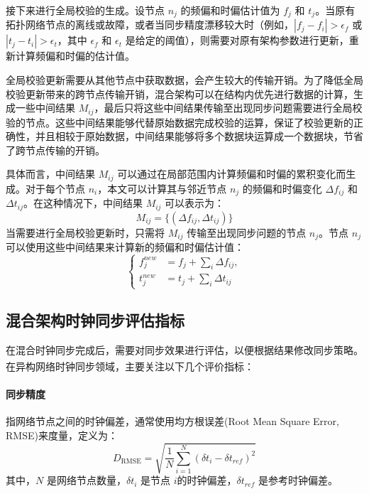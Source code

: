 \documentclass[UTF8,a4paper,12pt]{ctexart}
\numberwithin{equation}{section}
\begin{document}
	接下来进行全局校验的生成。设节点 $n_j$ 的频偏和时偏估计值为 $f_j$ 和 $t_j$。当原有拓扑网络节点的离线或故障，或者当同步精度漂移较大时（例如，$|f_j - f_i| > \epsilon_f$ 或 $|t_j - t_i| > \epsilon_t$，其中 $\epsilon_f$ 和 $\epsilon_t$ 是给定的阈值），则需要对原有架构参数进行更新，重新计算频偏和时偏的估计值。
	
	全局校验更新需要从其他节点中获取数据，会产生较大的传输开销。为了降低全局校验更新带来的跨节点传输开销，混合架构可以在结构内优先进行数据的计算，生成一些中间结果 $M_{ij}$，最后只将这些中间结果传输至出现同步问题需要进行全局校验的节点。这些中间结果能够代替原始数据完成校验的运算，保证了校验更新的正确性，并且相较于原始数据，中间结果能够将多个数据块运算成一个数据块，节省了跨节点传输的开销。
	
	具体而言，中间结果 $M_{ij}$ 可以通过在局部范围内计算频偏和时偏的累积变化而生成。对于每个节点 $n_i$，本文可以计算其与邻近节点 $n_j$ 的频偏和时偏变化 $\Delta f_{ij}$ 和 $\Delta t_{ij}$。在这种情况下，中间结果 $M_{ij}$ 可以表示为：
	\begin{equation}
		M_{ij} = \{(\Delta f_{ij}, \Delta t_{ij})\}
	\end{equation}
	当需要进行全局校验更新时，只需将 $M_{ij}$ 传输至出现同步问题的节点 $n_j$。节点 $n_j$ 可以使用这些中间结果来计算新的频偏和时偏估计值：
	\begin{equation}
		\left\{
		\begin{aligned}
			f_j^{new} &= f_j + \sum_{i} \Delta f_{ij},\\
			t_j^{new} &= t_j + \sum_{i} \Delta t_{ij}
		\end{aligned}
		\right.
	\end{equation}
	
	
	\subsection{混合架构时钟同步评估指标}
	
	在混合时钟同步完成后，需要对同步效果进行评估，以便根据结果修改同步策略。在异构网络时钟同步领域，主要关注以下几个评价指标\textsuperscript{\cite{chi2018ear}}：
	\paragraph{同步精度}指网络节点之间的时钟偏差，通常使用均方根误差(Root Mean Square Error, RMSE)来度量，定义为：
	\begin{equation}
		D_\text{RMSE} = \sqrt{\frac{1}{N} \sum_{i=1}^{N} (\delta t_{i} - \delta t_{ref})^2}
	\end{equation}
	其中，$N$ 是网络节点数量，$\delta t_{i}$ 是节点 $i$的时钟偏差，$\delta t_{ref}$ 是参考时钟偏差。
\end{document}
